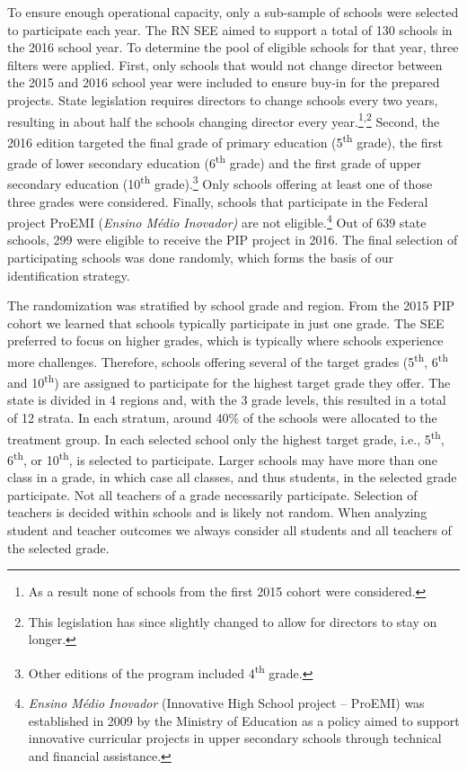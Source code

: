 \documentclass[11pt,a4paper]{article}
\begin{document}
To ensure enough operational capacity, only a sub-sample of schools were selected to participate each year. The RN SEE aimed to support a total of 130 schools in the 2016 school year. To determine the pool of eligible schools for that year, three filters were applied. First, only schools that would not change director between the 2015 and 2016 school year were included to ensure buy-in for the prepared projects. State legislation requires directors to change schools every two years, resulting in about half the schools changing director every year.\footnote{As a result none of schools from the first 2015 cohort were considered.}\textsuperscript{,}\footnote{This legislation has since slightly changed to allow for directors to stay on longer.} Second, the 2016 edition targeted the final grade of primary education (5\textsuperscript{th} grade), the first grade of lower secondary education (6\textsuperscript{th} grade) and the first grade of upper secondary education (10\textsuperscript{th} grade).\footnote{Other editions of the program included 4\textsuperscript{th} grade.} Only schools offering at least one of those three grades were considered. Finally, schools that participate in the Federal project ProEMI (\textit{Ensino Médio Inovador)} are not eligible.\footnote{\textit{Ensino Médio Inovador} (Innovative High School project -- ProEMI) was established in 2009 by the Ministry of Education as a policy aimed to support innovative curricular projects in upper secondary schools through technical and financial assistance.} Out of 639 state schools, 299 were eligible to receive the PIP project in 2016. The final selection of participating schools was done randomly, which forms the basis of our identification strategy. 

The randomization was stratified by school grade and region. From the 2015 PIP cohort we learned that schools typically participate in just one grade. The SEE preferred to focus on higher grades, which is typically where schools experience more challenges. Therefore, schools offering several of the target grades (5\textsuperscript{th}, 6\textsuperscript{th} and 10\textsuperscript{th}) are assigned to participate for the highest target grade they offer. The state is divided in 4 regions and, with the 3 grade levels, this resulted in a total of 12 strata. In each stratum, around 40\% of the schools were allocated to the treatment group. In each selected school only the highest target grade, i.e., 5\textsuperscript{th}, 6\textsuperscript{th}, or 10\textsuperscript{th}, is selected to participate. Larger schools may have more than one class in a grade, in which case all classes, and thus students, in the selected grade participate. Not all teachers of a grade necessarily participate. Selection of teachers is decided within schools and is likely not random. When analyzing student and teacher outcomes we always consider all students and all teachers of the selected grade. 
\end{document}
